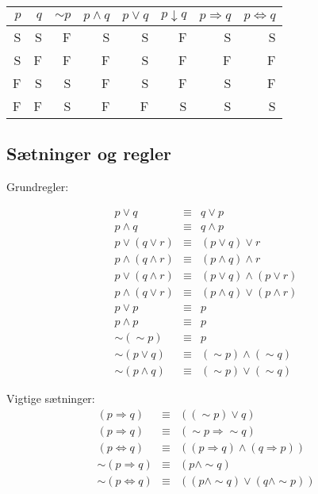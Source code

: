 \documentclass[a4paper]{article}
\begin{document}
\begin{center}
\begin{tabular} {|r|r||r|r|r|r|r|r|}
  \hline
  $p$ & $q$  & $\sim{}p$ &  $p\wedge{}q$ &  $p\vee{}q$ &  $p\downarrow{}q$  &  $p\Rightarrow{}q$  &  $p\Leftrightarrow{}q$ \\
  \hline
  \hline
  S&S&F&S&S&F&S&S\\
  \hline
  S&F&F&F&S&F&F&F\\
  \hline
  F&S&S&F&S&F&S&F\\
  \hline
  F&F&S&F&F&S&S&S\\
  \hline
\end{tabular}
\end{center}

\subsection{Sætninger og regler}

Grundregler:

\begin{eqnarray}
p \vee q &\equiv& q \vee p \\
p \wedge q &\equiv& q \wedge p \\
p \vee (q \vee r) &\equiv& (p \vee q) \vee r \\
p \wedge (q \wedge r) &\equiv& (p \wedge q) \wedge r \\
p \vee (q \wedge r) &\equiv& (p \vee q) \wedge (p \vee r) \\
p \wedge (q \vee r) &\equiv& (p \wedge q) \vee (p \wedge r) \\
p \vee p &\equiv& p \\
p \wedge p &\equiv& p \\
\sim (\sim p) &\equiv& p \\
\sim (p \vee q) &\equiv& (\sim p) \wedge (\sim q) \\
\sim (p \wedge q) &\equiv& (\sim p) \vee (\sim q) 
\end{eqnarray}

Vigtige sætninger:
\begin{eqnarray}
(p\Rightarrow q) &\equiv& ((\sim p) \vee q) \\
(p \Rightarrow q) &\equiv& (\sim p \Rightarrow \sim q) \\
(p \Leftrightarrow q) &\equiv& ((p \Rightarrow q) \wedge (q \Rightarrow p)) \\
\sim (p \Rightarrow q) &\equiv& (p \wedge \sim q) \\
\sim (p \Leftrightarrow q) &\equiv& ((p \wedge \sim q) \vee (q \wedge \sim p))
\end{eqnarray}
\end{document}

